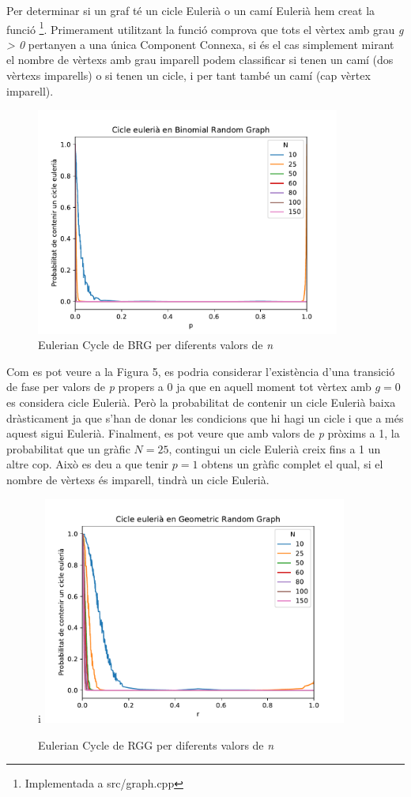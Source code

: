 Per determinar si un graf té un cicle Eulerià o un camí Eulerià hem creat la funció \footnote{Implementada a src/graph.cpp}. Primerament utilitzant la funció  comprova que tots el vèrtex amb grau \textit{g > 0} pertanyen a una única Component Connexa, si és el cas simplement mirant el nombre de vèrtexs amb grau imparell podem classificar si tenen un camí (dos vèrtexs imparells) o si tenen un cicle, i per tant també un camí (cap vèrtex imparell).

\begin{figure}[H]
    \centering
    \includegraphics[width=10cm]{plots/BRG_eulerianCycle.pdf}
    \caption{Eulerian Cycle de BRG per diferents valors de \textit{n}}
    \label{fig:connect_04}
\end{figure}

Com es pot veure a la Figura 5, es podria considerar l'existència d'una transició de fase per valors de \textit{p} propers a 0 ja que en aquell moment tot vèrtex amb $g=0$ es considera cicle Eulerià. Però la probabilitat de contenir un cicle Eulerià baixa dràsticament ja que s'han de donar les condicions que hi hagi un cicle i que a més aquest sigui Eulerià. Finalment, es pot veure que amb valors de \textit{p} pròxims a 1, la probabilitat que un gràfic $N=25$, contingui un cicle Eulerià creix fins a 1 un altre cop. Això es deu a que tenir $p=1$ obtens un gràfic complet el qual, si el nombre de vèrtexs és imparell, tindrà un cicle Eulerià.

\begin{figure}[H]
  i  \centering
    \includegraphics[width=10cm]{plots/GRG_eulerianCycle.pdf}
    \caption{Eulerian Cycle de RGG per diferents valors de \textit{n}}
    \label{fig:connect_04}
\end{figure}

